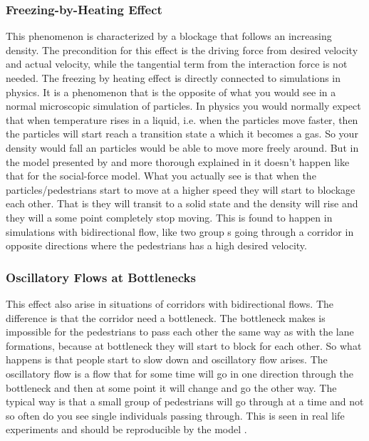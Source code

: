 \subsubsection{Freezing-by-Heating Effect}
This phenomenon is characterized by a blockage that follows an increasing 
density. The precondition for this effect is the driving force from desired 
velocity and actual velocity, while the tangential term from the interaction 
force is not needed. The freezing by heating effect is directly connected to simulations in physics\cite{frebyheat}. It is a  phenomenon that is the opposite of what you would see in a normal microscopic simulation of particles. In physics you would normally expect that when temperature rises in a liquid, i.e. when the particles move faster, then the particles will start reach a transition state a which it becomes a gas. So your density would fall an particles would be able to move more freely around. But in the model presented by \cite{self-org} and more thorough explained in \cite{frebyheat} it doesn't happen like that for the social-force model. What you actually see is that when the particles/pedestrians start to move at a higher speed they will start to blockage each other. That is they will transit to a solid state and the density will rise and they will a some point completely stop moving. This is found to happen  in simulations  with bidirectional flow, like two group
 s going through a corridor in opposite directions where the pedestrians has a high desired velocity.        


\subsubsection{Oscillatory Flows at Bottlenecks}
This effect also arise in situations of corridors with bidirectional flows. The difference is that the corridor need a bottleneck. The bottleneck makes is impossible for the pedestrians to pass each other the same way as with the lane formations, because at bottleneck they will start to block for each other. So what happens is that people start to slow down and oscillatory flow arises. The oscillatory flow is a flow that for some time will go in one direction through the bottleneck and then at some point it will change and go the other way. The typical way is that a small group of pedestrians will go through  at a time and not so often do you see single individuals passing through. This is seen in real life experiments and should be reproducible by the model \cite{self-org} .



